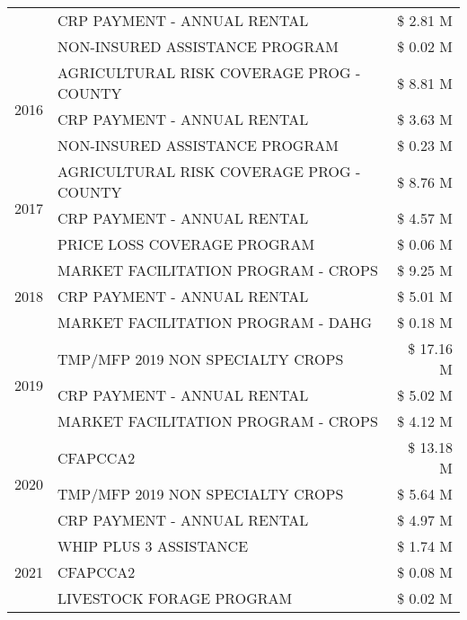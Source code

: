 \begin{tabular}{llr}
 & CRP PAYMENT - ANNUAL RENTAL & \$ 2.81 M \\
 & NON-INSURED ASSISTANCE PROGRAM & \$ 0.02 M \\
\cline{1-3}
\multirow[t]{3}{*}{2016} & AGRICULTURAL RISK COVERAGE PROG - COUNTY & \$ 8.81 M \\
 & CRP PAYMENT - ANNUAL RENTAL & \$ 3.63 M \\
 & NON-INSURED ASSISTANCE PROGRAM & \$ 0.23 M \\
\cline{1-3}
\multirow[t]{3}{*}{2017} & AGRICULTURAL RISK COVERAGE PROG - COUNTY & \$ 8.76 M \\
 & CRP PAYMENT - ANNUAL RENTAL & \$ 4.57 M \\
 & PRICE LOSS COVERAGE PROGRAM & \$ 0.06 M \\
\cline{1-3}
\multirow[t]{3}{*}{2018} & MARKET FACILITATION PROGRAM - CROPS & \$ 9.25 M \\
 & CRP PAYMENT - ANNUAL RENTAL & \$ 5.01 M \\
 & MARKET FACILITATION PROGRAM - DAHG & \$ 0.18 M \\
\cline{1-3}
\multirow[t]{3}{*}{2019} & TMP/MFP 2019 NON SPECIALTY CROPS & \$ 17.16 M \\
 & CRP PAYMENT - ANNUAL RENTAL & \$ 5.02 M \\
 & MARKET FACILITATION PROGRAM - CROPS & \$ 4.12 M \\
\cline{1-3}
\multirow[t]{3}{*}{2020} & CFAPCCA2 & \$ 13.18 M \\
 & TMP/MFP 2019 NON SPECIALTY CROPS & \$ 5.64 M \\
 & CRP PAYMENT - ANNUAL RENTAL & \$ 4.97 M \\
\cline{1-3}
\multirow[t]{3}{*}{2021} & WHIP PLUS 3 ASSISTANCE & \$ 1.74 M \\
 & CFAPCCA2 & \$ 0.08 M \\
 & LIVESTOCK FORAGE PROGRAM & \$ 0.02 M \\
\cline{1-3}
\bottomrule
\end{tabular}
